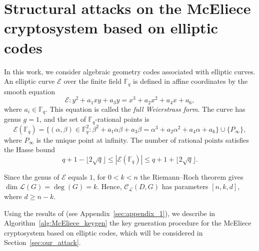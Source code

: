 \documentclass[sn-mathphys-num]{sn-jnl_modified}
\newcommand{\FF}{\ensuremath{\mathbb{F}}}
\begin{document}
\section{Structural attacks on the McEliece cryptosystem based on elliptic codes} \label{sec:R-R_spaces}
In this work, we consider algebraic geometry codes associated with elliptic curves. An elliptic curve $\mathcal{E}$ over the finite field $\FF_q$ is defined in affine coordinates by the smooth equation
\[
\mathcal{E}: y^2+a_1xy+a_3y=x^3+a_2x^2+a_4x+a_6,
\]
where $a_i\in\FF_q$. This equation is called the \emph{full Weierstrass form}. The curve has genus $g=1$, and the set of $\FF_q$-rational points is
\[
\mathcal{E}(\FF_q)=\{(\alpha,\beta)\in\FF_q^2:\beta^2+a_1\alpha\beta+a_3\beta=\alpha^3+a_2\alpha^2+a_4\alpha+a_6\}\cup\{P_\infty\},
\]
where $P_\infty$ is the unique point at infinity. The number of rational points satisfies the Hasse bound
\[
q+1-\lfloor2\sqrt q\rfloor\le |\mathcal{E}(\FF_q)|\le q+1+\lfloor2\sqrt q\rfloor.
\]

Since the genus of $\mathcal{E}$ equals $1$, for $0<k<n$ the Riemann--Roch theorem gives $\dim\mathscr{L}(G)=\deg(G) = k$. Hence, $\mathcal{C}_{\mathscr{L}}(D,G)$ has parameters $[n,k,d]$, where $d\ge n-k$.





Using the results of \cite{KM26} (see Appendix~\ref{sec:appendix_1}), we describe in Algorithm~\ref{alg:McEliece_keygen} the key generation procedure for the McEliece cryptosystem based on elliptic codes, which will be considered in Section~\ref{sec:our_attack}.
\end{document}
